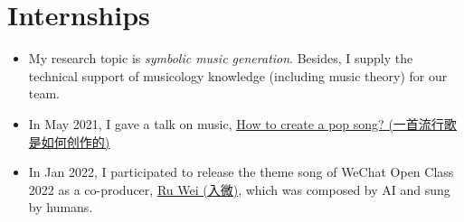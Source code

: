\documentclass{resume}
\begin{document}
{%

\section{Internships}
{\small {}
}
\begin{itemize}
  \item My research topic is \textit{symbolic music generation}. Besides, I supply the technical support of musicology knowledge (including music theory) for our team. 
  \item In May 2021, I gave a talk on music, \href{https://www.zhangxueyao.com/data/wcpr-pop-music.pdf}{\underline{How to create a pop song? (一首流行歌是如何创作的)}}
  \item In Jan 2022, I participated to release the theme song of WeChat Open Class 2022 as a co-producer, \href{https://y.qq.com/n/ryqq/songDetail/000xeNJ53orPG2}{Ru Wei (入微)}, which was composed by AI and sung by humans.
\end{itemize}


}
\end{document}
